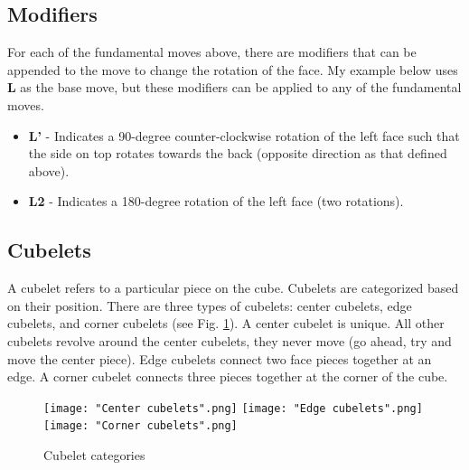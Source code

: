 \documentclass[11pt,english]{article}
\begin{document}
\subsection{Modifiers}
For each of the fundamental moves above, there are modifiers that can be appended to the move to change the rotation of the face. My example below uses \textbf{L} as the base move, but these modifiers can be applied to any of the fundamental moves.

\begin{itemize}
\item \textbf{L'} - Indicates a 90-degree counter-clockwise rotation of the left face such that the side on top rotates towards the back (opposite direction as that defined above).
\item \textbf{L2} - Indicates a 180-degree rotation of the left face (two rotations).
\end{itemize}

\subsection{Cubelets}
A cubelet refers to a particular piece on the cube. Cubelets are categorized based on their position. There are three types of cubelets: center cubelets, edge cubelets, and corner cubelets (see Fig. \ref{fig:cubelet_categories}). A center cubelet is unique. All other cubelets revolve around the center cubelets, they never move (go ahead, try and move the center piece). Edge cubelets connect two face pieces together at an edge. A corner cubelet connects three pieces together at the corner of the cube.

\begin{figure}[!htb]
  \texttt{[image: "Center cubelets".png]}
  \label{fig:center_cubelets}
\endminipage\hfill
{}
  \texttt{[image: "Edge cubelets".png]}
  \label{fig:edge_cubelets}
\endminipage\hfill
{}%
  \texttt{[image: "Corner cubelets".png]}
  \label{fig:corner_cubelets}
\endminipage
\caption{Cubelet categories}
\label{fig:cubelet_categories}
\end{figure}
\end{document}
